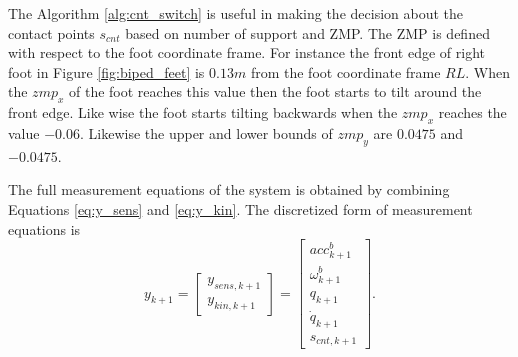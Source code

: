 The Algorithm \ref{alg:cnt_switch} is useful in making the decision about the contact points $s_{cnt}$ based on number of support and ZMP. The ZMP is defined with respect to the foot coordinate frame. For instance the front edge of right foot in Figure \ref{fig:biped_feet} is $0.13m$ from the foot coordinate frame $RL$. When the ${zmp}_x$ of the foot reaches this value then the foot starts to tilt around the front edge. Like wise the foot starts tilting backwards when the ${zmp}_x$ reaches the value $-0.06$. Likewise the upper and lower bounds of $zmp_y$ are $0.0475$ and $-0.0475$.

The full measurement equations of the system is obtained by combining Equations \ref{eq:y_sens} and \ref{eq:y_kin}. The discretized form of measurement equations is
\begin{equation}
    \label{eq:y_msr}
    y_{k+1} = \begin{bmatrix} y_{sens,k+1} \\ y_{kin,k+1} \end{bmatrix}= \begin{bmatrix} acc^b_{k+1} \\ \omega^b_{k+1} \\ q_{k+1} \\ \dot q_{k+1} \\ s_{cnt,k+1} \end{bmatrix}.
\end{equation}

